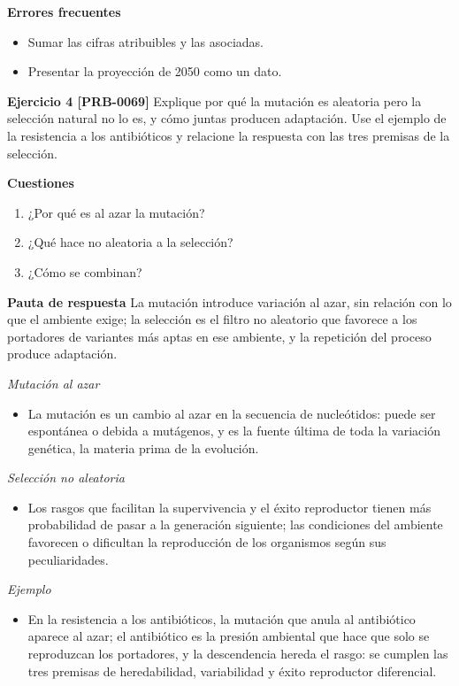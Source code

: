 \documentclass{book}
\begin{document}
\noindent\textbf{Errores frecuentes}
\begin{itemize}
\item Sumar las cifras atribuibles y las asociadas.
\item Presentar la proyección de 2050 como un dato.
\end{itemize}

\noindent\textbf{Ejercicio 4 [PRB-0069]}
Explique por qué la mutación es aleatoria pero la selección natural no lo es, y cómo juntas producen adaptación. Use el ejemplo de la resistencia a los antibióticos y relacione la respuesta con las tres premisas de la selección.


\noindent\textbf{Cuestiones}
\begin{enumerate}
\item ¿Por qué es al azar la mutación?
\item ¿Qué hace no aleatoria a la selección?
\item ¿Cómo se combinan?
\end{enumerate}

\noindent\textbf{Pauta de respuesta}
La mutación introduce variación al azar, sin relación con lo que el ambiente exige; la selección es el filtro no aleatorio que favorece a los portadores de variantes más aptas en ese ambiente, y la repetición del proceso produce adaptación.


\noindent\textit{Mutación al azar}
\begin{itemize}
\item La mutación es un cambio al azar en la secuencia de nucleótidos: puede ser espontánea o debida a mutágenos, y es la fuente última de toda la variación genética, la materia prima de la evolución.
\end{itemize}

\noindent\textit{Selección no aleatoria}
\begin{itemize}
\item Los rasgos que facilitan la supervivencia y el éxito reproductor tienen más probabilidad de pasar a la generación siguiente; las condiciones del ambiente favorecen o dificultan la reproducción de los organismos según sus peculiaridades.
\end{itemize}

\noindent\textit{Ejemplo}
\begin{itemize}
\item En la resistencia a los antibióticos, la mutación que anula al antibiótico aparece al azar; el antibiótico es la presión ambiental que hace que solo se reproduzcan los portadores, y la descendencia hereda el rasgo: se cumplen las tres premisas de heredabilidad, variabilidad y éxito reproductor diferencial.
\end{itemize}
\end{document}
